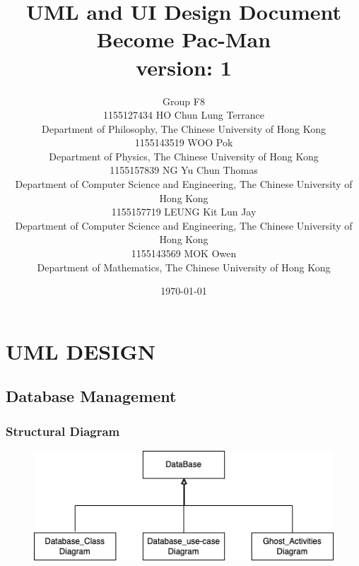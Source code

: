 \documentclass[11pt]{article}
\title{UML and UI Design Document\\Become Pac-Man\\version: 1}
\author{Group F8\\1155127434 HO Chun Lung Terrance\\
Department of Philosophy, The Chinese University of Hong Kong\\1155143519 WOO Pok\\
Department of Physics, The Chinese University of Hong Kong\\1155157839 NG Yu Chun Thomas\\
Department of Computer Science and Engineering, The Chinese University of Hong Kong\\1155157719 LEUNG Kit Lun Jay\\
Department of Computer Science and Engineering, The Chinese University of Hong Kong\\1155143569 MOK Owen\\
Department of Mathematics, The Chinese University of Hong Kong}
\date{\today}
\begin{document}
\maketitle
\tableofcontents
\newpage
\section{UML DESIGN}

\subsection{Database Management}
\subsubsection{Structural Diagram}
\begin{figure}[H]
    \centering
    \includegraphics*[scale=0.4]{Database_struct.png}
\end{figure}
\end{document}
